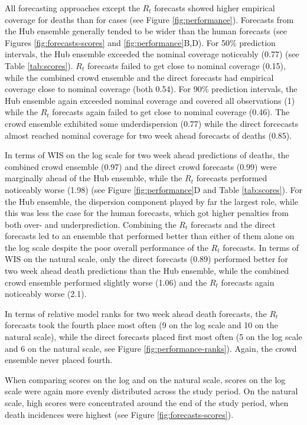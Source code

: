 \documentclass[10pt,a4paper,twocolumn]{article}
\begin{document}
All forecasting approaches except the $R_t$ forecasts showed higher empirical coverage for deaths than for cases (see Figure \ref{fig:performance}). Forecasts from the Hub ensemble generally tended to be wider than the human forecasts (see Figures \ref{fig:forecasts-scores} and \ref{fig:performance}B,D). For 50\% prediction intervals, the Hub ensemble exceeded the nominal coverage noticeably (0.77) (see Table \ref{tab:scores}). $R_t$ forecasts failed to get close to nominal coverage (0.15), while the combined crowd ensemble and the direct forecasts had empirical coverage close to nominal coverage (both 0.54). For 90\% prediction intervals, the Hub ensemble again exceeded nominal coverage and covered all observations (1) while the $R_t$ forecasts again failed to get close to nominal coverage (0.46). The crowd ensemble exhibited some underdispersion (0.77) while the direct forcecasts almost reached nominal coverage for two week ahead forecasts of deaths (0.85). 

In terms of WIS on the log scale for two week ahead predictions of deaths, the combined crowd ensemble (0.97) and the direct crowd forecasts (0.99) were marginally ahead of the Hub ensemble, while the $R_t$ forecasts performed noticeably worse (1.98) (see Figure \ref{fig:performance}D and Table \ref{tab:scores}). For the Hub ensemble, the dispersion component played by far the largest role, while this was less the case for the human forecasts, which got higher penalties from both over- and underprediction. Combining the $R_t$ forecasts and the direct forecasts led to an ensemble that performed better than either of them alone on the log scale despite the poor overall performance of the $R_t$ forecasts. 
In terms of WIS on the natural scale, only the direct forecasts (0.89) performed better for two week ahead death predictions than the Hub ensemble, while the combined crowd ensemble performed slightly worse (1.06) and the $R_t$ forecasts again noticeably worse (2.1). 

In terms of relative model ranks for two week ahead death forecasts, the $R_t$ forecasts took the fourth place most often (9 on the log scale and 10 on the natural scale), while the direct forecasts placed first most often (5 on the log scale and 6 on the natural scale, see Figure \ref{fig:performance-ranks}). Again, the crowd ensemble never placed fourth.  

When comparing scores on the log and on the natural scale, scores on the log scale were again more evenly distributed across the study period. On the natural scale, high scores were concentrated around the end of the study period, when death incidences were highest (see Figure \ref{fig:forecasts-scores}). 
\end{document}
